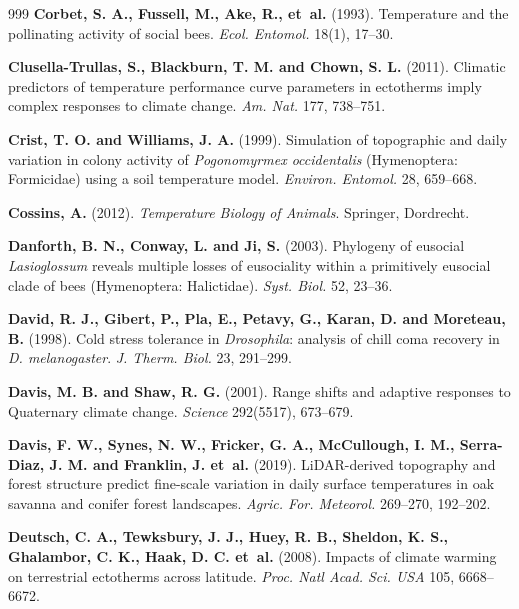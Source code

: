 \documentclass[11pt,a4paper]{article}
\begin{document}
\begin{thebibliography}{999}
\textbf{Corbet, S. A., Fussell, M., Ake, R., et~al.} (1993).
Temperature and the pollinating activity of social bees.
\textit{Ecol. Entomol.} 18(1), 17--30.

\textbf{Clusella-Trullas, S., Blackburn, T. M. and Chown, S. L.} (2011).
Climatic predictors of temperature performance curve parameters in ectotherms imply complex responses to climate change.
\textit{Am. Nat.} 177, 738--751.

\textbf{Crist, T. O. and Williams, J. A.} (1999). Simulation of topographic and daily variation in colony activity of \textit{Pogonomyrmex occidentalis} (Hymenoptera: Formicidae) using a soil temperature model. \textit{Environ. Entomol.} 28, 659--668.

\textbf{Cossins, A.} (2012). \textit{Temperature Biology of Animals}. Springer, Dordrecht.

\textbf{Danforth, B. N., Conway, L. and Ji, S.} (2003). Phylogeny of eusocial \textit{Lasioglossum} reveals multiple losses of eusociality within a primitively eusocial clade of bees (Hymenoptera: Halictidae). \textit{Syst. Biol.} 52, 23--36.

\textbf{David, R. J., Gibert, P., Pla, E., Petavy, G., Karan, D. and Moreteau, B.} (1998).
Cold stress tolerance in \textit{Drosophila}: analysis of chill coma recovery in \textit{D. melanogaster}.
\textit{J. Therm. Biol.} 23, 291--299.

\textbf{Davis, M. B. and Shaw, R. G.} (2001).
Range shifts and adaptive responses to Quaternary climate change.
\textit{Science} 292(5517), 673--679.

\textbf{Davis, F. W., Synes, N. W., Fricker, G. A., McCullough, I. M., Serra-Diaz, J. M. and Franklin, J. et~al.} (2019).
LiDAR-derived topography and forest structure predict fine-scale variation in daily surface temperatures in oak savanna and conifer forest landscapes.
\textit{Agric. For. Meteorol.} 269--270, 192--202.

\textbf{Deutsch, C. A., Tewksbury, J. J., Huey, R. B., Sheldon, K. S., Ghalambor, C. K., Haak, D. C. et~al.} (2008).
Impacts of climate warming on terrestrial ectotherms across latitude.
\textit{Proc. Natl Acad. Sci. USA} 105, 6668--6672.


\end{thebibliography}
\end{document}
